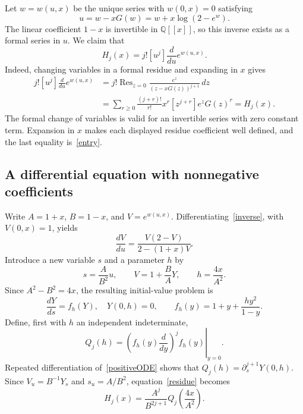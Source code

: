 \documentclass[11pt]{article}
\newcommand{\res}{\operatorname{Res}}
\begin{document}
Let $w=w(u,x)$ be the unique series with $w(0,x)=0$ satisfying
\begin{equation}\label{inverse}
 u=w-xG(w)=w+x\log(2-e^w).
\end{equation}
The linear coefficient $1-x$ is invertible in $\mathbb Q[[x]]$, so this
inverse exists as a formal series in $u$. We claim that
\begin{equation}\label{residue}
 H_j(x)=j![u^j]\frac{d}{du}e^{w(u,x)}.
\end{equation}
Indeed, changing variables in a formal residue and expanding in $x$ gives
\begin{align*}
 j![u^j]\frac{d}{du}e^{w(u,x)}
 &=j!\res_{z=0}\frac{e^z}{(z-xG(z))^{j+1}}\,dz\\
 &=\sum_{r\geq0}\frac{(j+r)!}{r!}x^r
             [z^{j+r}]e^zG(z)^r=H_j(x).
\end{align*}
The formal change of variables is valid for an invertible series with zero
constant term. Expansion in $x$ makes each displayed residue coefficient
well defined, and the last equality is~\eqref{entry}.

\subsection*{A differential equation with nonnegative coefficients}
Write $A=1+x$, $B=1-x$, and $V=e^{w(u,x)}$. Differentiating~\eqref{inverse},
with $V(0,x)=1$, yields
\[
 \frac{dV}{du}=\frac{V(2-V)}{2-(1+x)V}.
\]
Introduce a new variable $s$ and a parameter $h$ by
\[
 s=\frac{A}{B^2}u,\qquad
 V=1+\frac BA Y,\qquad h=\frac{4x}{A^2}.
\]
Since $A^2-B^2=4x$, the resulting initial-value problem is
\begin{equation}\label{positiveODE}
 \frac{dY}{ds}=f_h(Y),\quad Y(0,h)=0,\qquad
 f_h(y)=1+y+\frac{hy^2}{1-y}.
\end{equation}
Define, first with $h$ an independent indeterminate,
\[
 Q_j(h)=\left.\left(f_h(y)\frac{d}{dy}\right)^j f_h(y)\right|_{y=0}.
\]
Repeated differentiation of~\eqref{positiveODE} shows that
$Q_j(h)=\partial_s^{j+1}Y(0,h)$. Since
$V_u=B^{-1}Y_s$ and $s_u=A/B^2$, equation~\eqref{residue} becomes
\begin{equation}\label{Qidentity}
 H_j(x)=\frac{A^j}{B^{2j+1}}Q_j\!\left(\frac{4x}{A^2}\right).
\end{equation}
\end{document}

